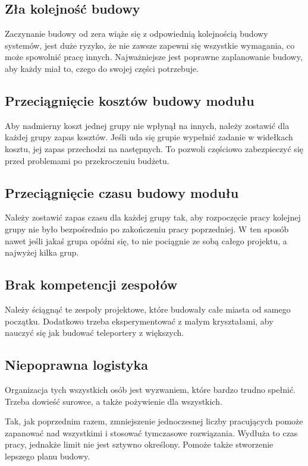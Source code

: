 \subsection{Zła kolejność budowy}
Zaczynanie budowy od zera wiąże się z odpowiednią kolejnością budowy systemów, jest duże ryzyko, że nie zawsze zapewni się wszystkie wymagania, co może spowolnić pracę innych. 
Najważniejsze jest poprawne zaplanowanie budowy, aby każdy miał to, czego do swojej części potrzebuje.

\subsection{Przeciągnięcie kosztów budowy modułu}
Aby nadmierny koszt jednej grupy nie wpłynął na innych, należy zostawić dla każdej grupy zapas kosztów.
Jeśli uda się grupie wypełnić zadanie w widełkach kosztu, jej zapas przechodzi na następnych.
To pozwoli częściowo zabezpieczyć się przed problemami po przekroczeniu budżetu.

\subsection{Przeciągnięcie czasu budowy modułu}
Należy zostawić zapas czasu dla każdej grupy tak, aby rozpoczęcie pracy kolejnej grupy nie było bezpośrednio po zakończeniu pracy poprzedniej.
W ten sposób nawet jeśli jakaś grupa opóźni się, to nie pociągnie ze sobą całego projektu, a najwyżej kilka grup.

\subsection{Brak kompetencji zespołów}
Należy ściągnąć te zespoły projektowe, które budowały całe miasta od samego początku.
Dodatkowo trzeba eksperymentować z małym kryształami, aby nauczyć się jak budować teleportery z większych.

\subsection{Niepoprawna logistyka}
Organizacja tych wszystkich osób jest wyzwaniem, które bardzo trudno spełnić. Trzeba dowieść surowce, a także pożywienie dla wszystkich. 

Tak, jak poprzednim razem, zmniejszenie jednoczesnej liczby pracujących pomoże zapanować nad wszystkimi i stosować tymczasowe rozwiązania.
Wydłuża to czas pracy, jednakże limit nie jest sztywno określony. Pomoże także stworzenie lepszego planu budowy.
 
